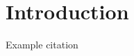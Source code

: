 \section{Introduction}
\label{sec:introduction}
Example citation \citet{Cresci:2017:PSS:3041021.3055135}
